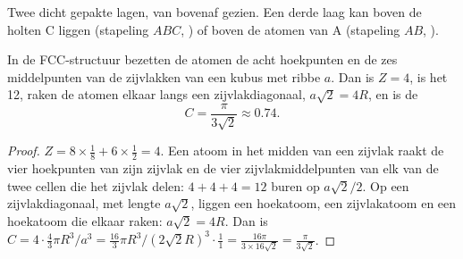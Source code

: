 \begin{omfigure}

{\small Twee dicht gepakte lagen, van bovenaf gezien. Een derde laag kan
boven de holten C liggen (stapeling $ABC$, ) of
boven de atomen van A (stapeling $AB$, ).}
\end{omfigure}

\begin{proposition}\label{prop:b1:crystals-metals:fcc}
In de FCC-structuur bezetten de atomen de acht hoekpunten en de zes
middelpunten van de zijvlakken van een kubus met ribbe $a$. Dan is
$Z = 4$, is het  12, raken de atomen elkaar langs een
zijvlakdiagonaal, $a\sqrt2 = 4R$, en is de 
\[
  C = \frac{\pi}{3\sqrt2} \approx 0.74 .
\]
\end{proposition}

\begin{proof}
$Z = 8 \times \frac18 + 6 \times \frac12 = 4$. Een atoom in het midden
van een zijvlak raakt de vier hoekpunten van zijn zijvlak en de vier
zijvlakmiddelpunten van elk van de twee cellen die het zijvlak delen:
$4 + 4 + 4 = 12$ buren op $a\sqrt2/2$. Op een zijvlakdiagonaal, met
lengte $a\sqrt2$, liggen een hoekatoom, een zijvlakatoom en een hoekatoom
die elkaar raken: $a\sqrt2 = 4R$. Dan is
$C = 4 \cdot \frac43\pi R^3/a^3 = \frac{16}{3}\pi R^3/(2\sqrt2 R)^3 \cdot
\frac{1}{1} = \frac{16\pi}{3 \times 16\sqrt2} = \frac{\pi}{3\sqrt2}$.
\end{proof}

